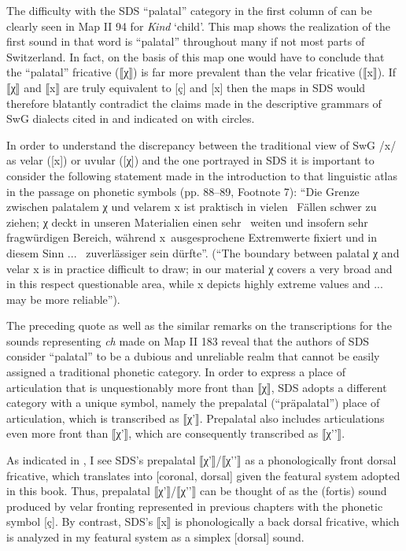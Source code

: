 {The difficulty with the SDS “palatal” category in the first column of  can be clearly seen in Map II 94 for \textit{Kind} ‘child’. This map shows the realization of the first sound in that word is “palatal” throughout many if not most parts of Switzerland. In fact, on the basis of this map one would have to conclude that the “palatal” fricative (⟦χ⟧) is far more prevalent than the velar fricative (⟦x⟧). If ⟦χ⟧ and ⟦x⟧ are truly equivalent to [ç] and [x] then the maps in SDS would therefore blatantly  contradict the claims made in the descriptive grammars of SwG dialects cited in  and indicated on  with circles.

In order to understand the discrepancy between the traditional view of SwG /x/ as velar ([x]) or uvular ([χ]) and the one portrayed in SDS it is important to consider the following statement made in the introduction to that linguistic atlas \citep{Hotzenköcherle1962} in the passage on phonetic symbols (pp. 88--89, Footnote 7): “Die Grenze zwischen palatalem χ und velarem x ist praktisch in vielen~ Fällen schwer zu ziehen; χ deckt in unseren Materialien einen sehr~ weiten und insofern sehr fragwürdigen Bereich, während x~ausgesprochene Extremwerte fixiert und in diesem Sinn ...~ zuverlässiger sein dürfte”. (“The boundary between palatal χ and velar x is in practice difficult to draw; in our material χ covers a very broad and in this respect questionable area, while x depicts highly extreme values and ... may be more reliable”).

The preceding quote as well as the similar remarks on the transcriptions for the sounds representing \textit{ch} made on Map II 183 reveal that the authors of SDS consider “palatal” to be a dubious and unreliable realm that cannot be easily assigned a traditional phonetic category. In order to express a place of articulation that is unquestionably more front than ⟦χ⟧, SDS adopts a different category with a unique symbol, namely the prepalatal (“präpalatal”) place of articulation, which is transcribed as ⟦χ'⟧. Prepalatal also includes articulations even more front than ⟦χ'⟧, which are consequently transcribed as ⟦χ'{}'⟧.

As indicated in , I see SDS’s prepalatal ⟦χ'⟧/⟦χ'{}'⟧ as a phonologically front dorsal fricative, which translates into [coronal, dorsal] given the featural system adopted in this book. Thus, prepalatal ⟦χ'⟧/⟦χ'{}'⟧ can be thought of as the (fortis) sound produced by velar fronting represented in previous chapters with the phonetic symbol [ç]. By contrast, SDS’s ⟦x⟧ is phonologically a back dorsal fricative, which is analyzed in my featural system as a simplex [dorsal] sound.

}

